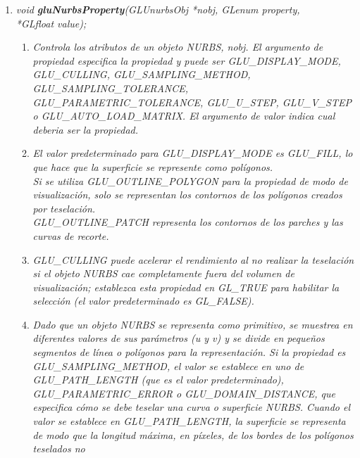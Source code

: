 \begin{enumerate}
    \item[] \emph{void \textbf{gluNurbsProperty}(GLUnurbsObj *nobj, GLenum property,\\*GLfloat value);}
    \begin{enumerate}
        \item[] \textit{
            Controla los atributos de un objeto NURBS, nobj.
            El argumento de propiedad especifica la propiedad y puede
            ser GLU\_DISPLAY\_MODE, GLU\_CULLING, GLU\_SAMPLING\_METHOD,
            GLU\_SAMPLING\_TOLERANCE,\\ GLU\_PARAMETRIC\_TOLERANCE, GLU\_U\_STEP,
            GLU\_V\_STEP\\ o GLU\_AUTO\_LOAD\_MATRIX. El argumento de valor indica
            cual deberia ser la propiedad.
        }
        \item[] \textit{
            El valor predeterminado para GLU\_DISPLAY\_MODE
            es GLU\_FILL, lo que hace que la superficie se represente
            como polígonos.\\Si se utiliza GLU\_OUTLINE\_POLYGON para la
            propiedad de modo de visualización, solo se representan los
            contornos de los polígonos creados por teselación.\\
            GLU\_OUTLINE\_PATCH representa los contornos de los parches
            y las curvas de recorte.
        }
        \item[] \textit{
            GLU\_CULLING puede acelerar el rendimiento al
            no realizar la teselación si el objeto NURBS cae completamente
            fuera del volumen de visualización; establezca esta propiedad
            en GL\_TRUE para habilitar la selección (el valor
            predeterminado es GL\_FALSE).
        }
        \item[] \textit{Dado que un objeto NURBS se representa como
            primitivo, se muestrea en diferentes valores de sus
            parámetros (u y v) y se divide en pequeños segmentos de
            línea o polígonos para la representación. Si la propiedad
            es GLU\_SAMPLING\_METHOD, el valor se establece en uno
            de GLU\_PATH\_LENGTH (que es el valor
            predeterminado), GLU\_PARAMETRIC\_ERROR o
            GLU\_DOMAIN\_DISTANCE, que
            especifica cómo se debe teselar una curva o superficie
            NURBS. Cuando el valor se establece en GLU\_PATH\_LENGTH,
            la superficie se representa de modo que la longitud máxima,
            en píxeles, de los bordes de los polígonos teselados no
}
\end{enumerate}
\end{enumerate}
